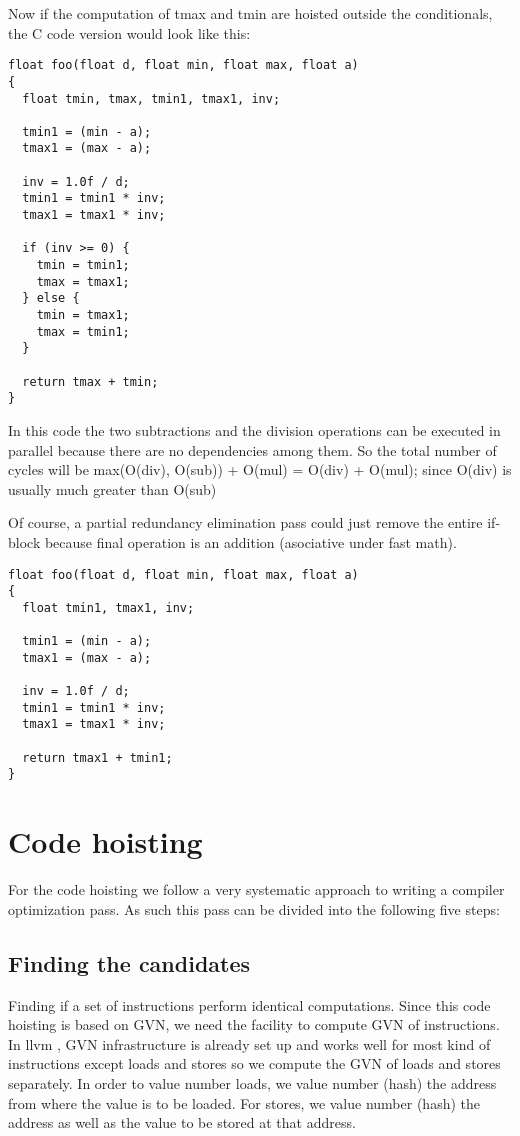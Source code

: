 \documentclass{sig-alternate}
\begin{document}
Now if the computation of tmax and tmin are hoisted outside the
conditionals, the C code version would look like this:
\begin{verbatim}
float foo(float d, float min, float max, float a)
{
  float tmin, tmax, tmin1, tmax1, inv;

  tmin1 = (min - a);
  tmax1 = (max - a);

  inv = 1.0f / d;
  tmin1 = tmin1 * inv;
  tmax1 = tmax1 * inv;

  if (inv >= 0) {
    tmin = tmin1;
    tmax = tmax1;
  } else {
    tmin = tmax1;
    tmax = tmin1;
  }

  return tmax + tmin;
}

\end{verbatim}

In this code the two subtractions and the division operations can be executed in
parallel because there are no dependencies among them. So the total number of
cycles will be max(O(div), O(sub)) + O(mul) = O(div) + O(mul); since O(div) is
usually much greater than O(sub) \cite{x86,aarch64}

Of course, a partial redundancy elimination pass could just remove the entire
if-block because final operation is an addition (asociative under fast math).

\begin{verbatim}
float foo(float d, float min, float max, float a)
{
  float tmin1, tmax1, inv;

  tmin1 = (min - a);
  tmax1 = (max - a);

  inv = 1.0f / d;
  tmin1 = tmin1 * inv;
  tmax1 = tmax1 * inv;

  return tmax1 + tmin1;
}
\end{verbatim}


\newpage

\section{Code hoisting}
For the code hoisting we follow a very systematic approach to writing a compiler
optimization pass. As such this pass can be divided into the following five
steps:

\subsection{Finding the candidates}
Finding if a set of instructions perform identical computations. Since this code
hoisting is based on GVN, we need the facility to compute GVN of instructions.
In llvm \cite{llvm}, GVN infrastructure is already set up and works well for
most kind of instructions except loads and stores so we compute the GVN of loads
and stores separately. In order to value number loads, we value number (hash)
the address from where the value is to be loaded. For stores, we value number
(hash) the address as well as the value to be stored at that address.
\end{document}
